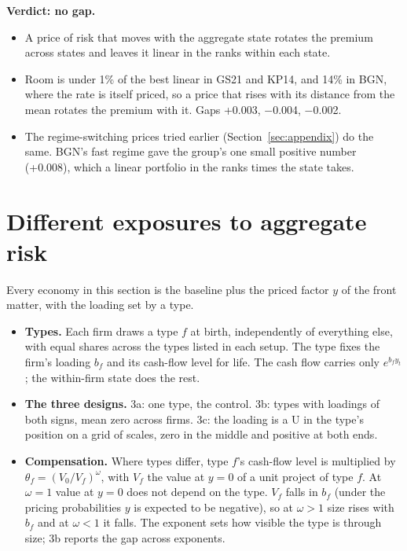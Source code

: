 \documentclass[11pt]{article}
\begin{document}


\textbf{Verdict: no gap.}

\begin{itemize}
\item A price of risk that moves with the aggregate state rotates the premium across states and leaves it linear in the ranks within each state.
\item Room is under 1\% of the best linear in GS21 and KP14, and 14\% in BGN, where the rate is itself priced, so a price that rises with its distance from the mean rotates the premium with it. Gaps +0.003, $-$0.004, $-$0.002.
\item The regime-switching prices tried earlier (Section~\ref{sec:appendix}) do the same. BGN's fast regime gave the group's one small positive number (+0.008), which a linear portfolio in the ranks times the state takes.
\end{itemize}
\section{Different exposures to aggregate risk}

Every economy in this section is the baseline plus the priced factor $y$ of the front matter, with the loading set by a type.

\begin{itemize}
\item \textbf{Types.} Each firm draws a type $f$ at birth, independently of everything else, with equal shares across the types listed in each setup. The type fixes the firm's loading $b_f$ and its cash-flow level for life. The cash flow carries only $e^{b_f y_t}$; the within-firm state does the rest.
\item \textbf{The three designs.} 3a: one type, the control. 3b: types with loadings of both signs, mean zero across firms. 3c: the loading is a U in the type's position on a grid of scales, zero in the middle and positive at both ends.
\item \textbf{Compensation.} Where types differ, type $f$'s cash-flow level is multiplied by $\theta_f = (V_0/V_f)^{\omega}$, with $V_f$ the value at $y = 0$ of a unit project of type $f$. At $\omega = 1$ value at $y = 0$ does not depend on the type. $V_f$ falls in $b_f$ (under the pricing probabilities $y$ is expected to be negative), so at $\omega > 1$ size rises with $b_f$ and at $\omega < 1$ it falls. The exponent sets how visible the type is through size; 3b reports the gap across exponents.
\end{itemize}
\end{document}
